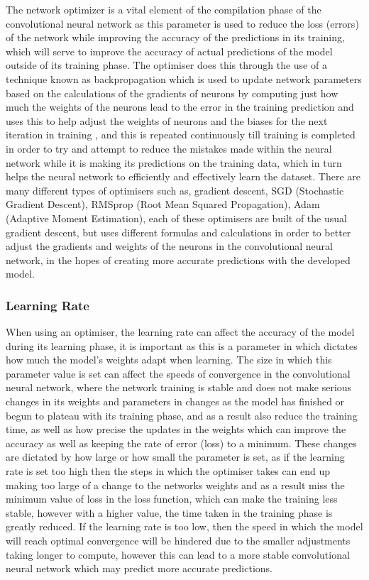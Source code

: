 \documentclass[]{final_report}
\begin{document}
The network optimizer is a vital element of the compilation phase of the convolutional neural network as this parameter is used to reduce the loss (errors) of the network while improving the accuracy of the predictions in its training, which will serve to improve the accuracy of actual predictions of the model outside of its training phase. The optimiser does this through the use of a technique known as backpropagation which is used to update network parameters based on the calculations of the gradients of neurons by computing just how much the weights of the neurons lead to the error in the training prediction and uses this to help adjust the weights of neurons and the biases for the next iteration in training , and this is repeated continuously till training is completed in order to try and attempt to reduce the mistakes made within the neural network while it is making its predictions on the training data, which in turn helps the neural network to efficiently and effectively learn the dataset. There are many different types of optimisers such as, gradient descent, SGD (Stochastic Gradient Descent), RMSprop (Root Mean Squared Propagation), Adam (Adaptive Moment Estimation), each of these optimisers are built of the usual gradient descent, but uses different formulas and calculations in order to better adjust the gradients and weights of the neurons in the convolutional neural network, in the hopes of creating more accurate predictions with the developed model.

\subsubsection{Learning Rate}

When using an optimiser, the learning rate can affect the accuracy of the model during its learning phase, it is important as this is a parameter in which dictates how much the model's weights adapt when learning. The size in which this parameter value is set can affect the speeds of convergence in the convolutional neural network, where the network training is stable and does not make serious changes in its weights and parameters in changes as the model has finished or begun to plateau with its training phase, and as a result also reduce the training time, as well as how precise the updates in the weights which can improve the accuracy as well as keeping the rate of error (loss) to a minimum. These changes are dictated by how large or how small the parameter is set, as if the learning rate is set too high then the steps in which the optimiser takes can end up making too large of a change to the networks weights and as a result miss the minimum value of loss in the loss function, which can make the training less stable, however with a higher value, the time taken in the training phase is greatly reduced. If the learning rate is too low, then the speed in which the model will reach optimal convergence will be hindered due to the smaller adjustments taking longer to compute, however this can lead to a more stable convolutional neural network which may predict more accurate predictions.
\end{document}
